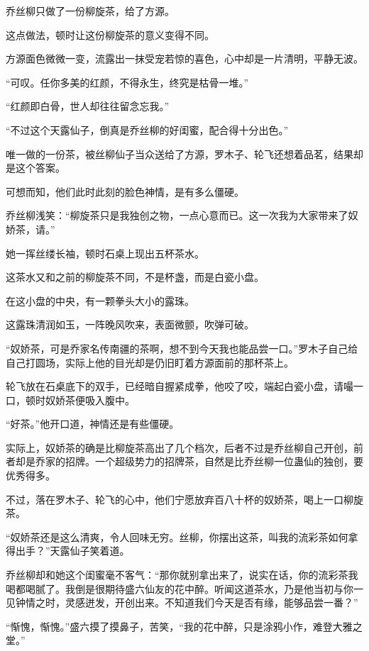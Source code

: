 
\begin{this_body}

乔丝柳只做了一份柳旋茶，给了方源。

这点做法，顿时让这份柳旋茶的意义变得不同。

方源面色微微一变，流露出一抹受宠若惊的喜色，心中却是一片清明，平静无波。

“可叹。任你多美的红颜，不得永生，终究是枯骨一堆。”

“红颜即白骨，世人却往往留念忘我。”

“不过这个天露仙子，倒真是乔丝柳的好闺蜜，配合得十分出色。”

唯一做的一份茶，被丝柳仙子当众送给了方源，罗木子、轮飞还想着品茗，结果却是这个答案。

可想而知，他们此时此刻的脸色神情，是有多么僵硬。

乔丝柳浅笑：“柳旋茶只是我独创之物，一点心意而已。这一次我为大家带来了奴娇茶，请。”

她一挥丝缕长袖，顿时石桌上现出五杯茶水。

这茶水又和之前的柳旋茶不同，不是杯盏，而是白瓷小盘。

在这小盘的中央，有一颗拳头大小的露珠。

这露珠清润如玉，一阵晚风吹来，表面微颤，吹弹可破。

“奴娇茶，可是乔家名传南疆的茶啊，想不到今天我也能品尝一口。”罗木子自己给自己打圆场，实际上他的目光却是仍旧盯着方源面前的那杯茶上。

轮飞放在石桌底下的双手，已经暗自握紧成拳，他咬了咬，端起白瓷小盘，请嘬一口，顿时奴娇茶便吸入腹中。

“好茶。”他开口道，神情还是有些僵硬。

实际上，奴娇茶的确是比柳旋茶高出了几个档次，后者不过是乔丝柳自己开创，前者却是乔家的招牌。一个超级势力的招牌茶，自然是比乔丝柳一位蛊仙的独创，要优秀得多。

不过，落在罗木子、轮飞的心中，他们宁愿放弃百八十杯的奴娇茶，喝上一口柳旋茶。

“奴娇茶还是这么清爽，令人回味无穷。丝柳，你摆出这茶，叫我的流彩茶如何拿得出手？”天露仙子笑着道。

乔丝柳却和她这个闺蜜毫不客气：“那你就别拿出来了，说实在话，你的流彩茶我喝都喝腻了。我倒是很期待盛六仙友的花中醉。听闻这道茶水，乃是他当初与你一见钟情之时，灵感迸发，开创出来。不知道我们今天是否有缘，能够品尝一番？”

“惭愧，惭愧。”盛六摸了摸鼻子，苦笑，“我的花中醉，只是涂鸦小作，难登大雅之堂。”


\end{this_body}
